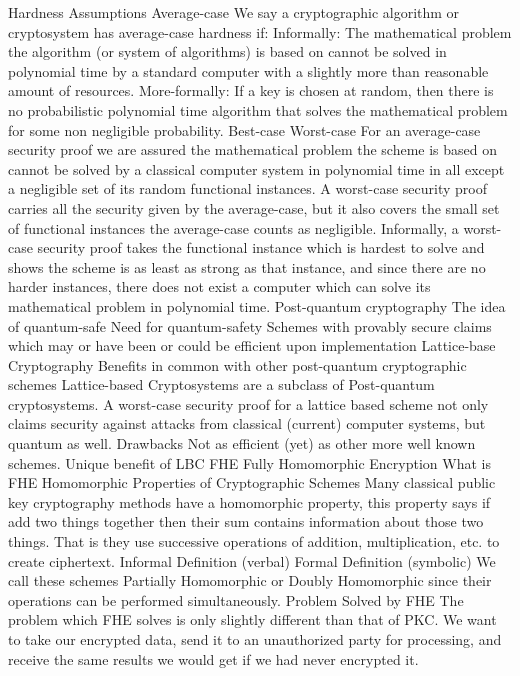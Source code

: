 \begin{itemize}
Hardness Assumptions Average-case We say a
cryptographic algorithm or cryptosystem has average-case hardness if:
Informally: The mathematical problem the algorithm (or system of
algorithms) is based on cannot be solved in polynomial time by a
standard computer with a slightly more than reasonable amount of
resources. More-formally: If a key is chosen at random, then there is
no probabilistic polynomial time algorithm that solves the mathematical
problem for some non negligible probability. Best-case Worst-case For
an average-case security proof we are assured the mathematical problem
the scheme is based on cannot be solved by a classical computer system
in polynomial time in all except a negligible set of its random
functional instances. A worst-case security proof carries all the
security given by the average-case, but it also covers the small set of
functional instances the average-case counts as negligible. Informally,
a worst-case security proof takes the functional instance which is
hardest to solve and shows the scheme is as least as strong as that
instance, and since there are no harder instances, there does not exist
a computer which can solve its mathematical problem in polynomial time.
Post-quantum cryptography The idea of quantum-safe Need for
quantum-safety Schemes with provably secure claims which may or have
been or could be efficient upon implementation Lattice-base
Cryptography Benefits in common with other post-quantum cryptographic
schemes Lattice-based Cryptosystems are a subclass of Post-quantum
cryptosystems. A worst-case security proof for a lattice based scheme
not only claims security against attacks from classical (current)
computer systems, but quantum as well. Drawbacks Not as efficient (yet)
as other more well known schemes. Unique benefit of LBC FHE Fully
Homomorphic Encryption What is FHE Homomorphic Properties of
Cryptographic Schemes Many classical public key cryptography methods
have a homomorphic property, this property says if add two things
together then their sum contains information about those two things.
That is they use successive operations of addition, multiplication,
etc. to create ciphertext. Informal Definition (verbal) Formal
Definition (symbolic) We call these schemes Partially Homomorphic or
Doubly Homomorphic since their operations can be performed
simultaneously. Problem Solved by FHE The problem which FHE solves is
only slightly different than that of PKC. We want to take our encrypted
data, send it to an unauthorized party for processing, and receive the
same results we would get if we had never encrypted it.

\end{itemize}
